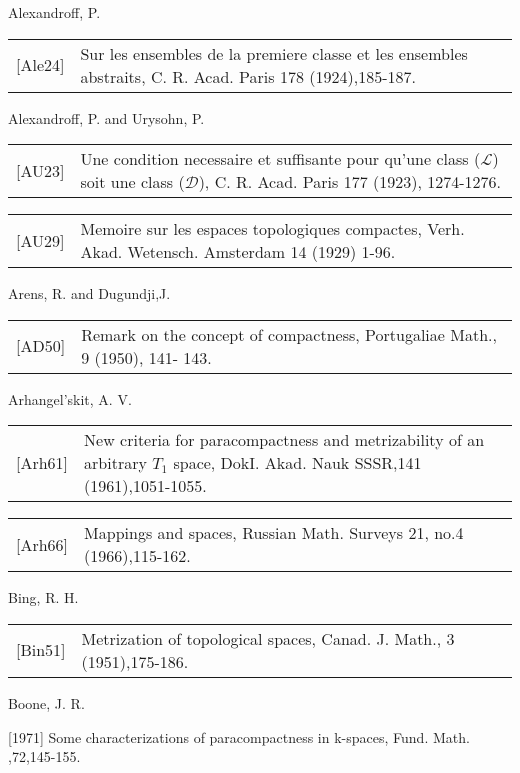 \documentclass[main.tex]{subfiles}
\begin{document}
\noindent Alexandroff, P.

\begin{tabular}{l p{145mm}}
[Ale24] & Sur les ensembles de la premiere classe et les ensembles abstraits, C. R. Acad. Paris 178 (1924),185-187. \\
\end{tabular}

\vspace{1mm}
\noindent Alexandroff, P. and Urysohn, P.

\begin{tabular}{l p{145mm}}
[AU23] & Une condition necessaire et suffisante pour qu'une class ($\mathscr{L}$) soit une class ($\mathscr{D}$), C. R. Acad. Paris 177 (1923), 1274-1276.\\
\end{tabular}

\begin{tabular}{l p{145mm}}
[AU29] & Memoire sur les espaces topologiques compactes, Verh. Akad. Wetensch. Amsterdam 14 (1929) 1-96.\\
\end{tabular}

\noindent Arens, R. and Dugundji,J.

\begin{tabular}{l p{145mm}}
	[AD50] & Remark on the concept of compactness, Portugaliae Math., 9 (1950), 141- 143.
\end{tabular}

\noindent Arhangel'skit, A. V.

\begin{tabular}{l p{145mm}}
[Arh61] & New criteria for paracompactness and metrizability of an arbitrary $T_1$ space, DokI. Akad. Nauk SSSR,141 (1961),1051-1055.\\
\end{tabular}

\begin{tabular}{l p{145mm}}
[Arh66] & Mappings and spaces, Russian Math. Surveys 21, no.4 (1966),115-162.
\end{tabular}

\noindent Bing, R. H.

\begin{tabular}{l p{145mm}}
[Bin51] & Metrization of topological spaces, Canad. J. Math., 3 (1951),175-186.
\end{tabular}

\noindent Boone, J. R.

[1971]
Some characterizations of paracompactness in k-spaces, Fund.
Math. ,72,145-155.
\end{document}
